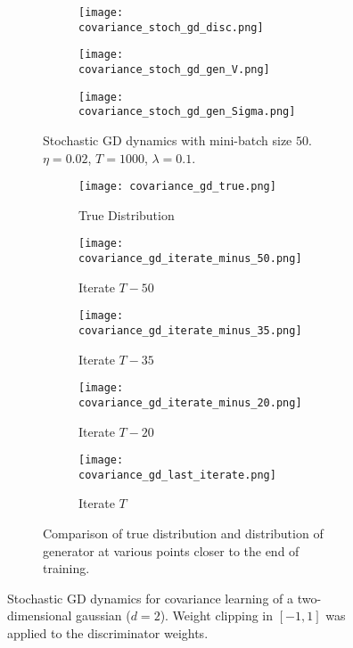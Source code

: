 \begin{figure}[H]
    \begin{subfigure}[b]{1\textwidth}
        \centering
    		\begin{subfigure}[b]{.3\textwidth}
    		\texttt{[image: covariance\_stoch\_gd\_disc.png]}
			\end{subfigure}        
    		\begin{subfigure}[b]{.3\textwidth}
    		\texttt{[image: covariance\_stoch\_gd\_gen\_V.png]}
			\end{subfigure}        
    		\begin{subfigure}[b]{.3\textwidth}
    		\texttt{[image: covariance\_stoch\_gd\_gen\_Sigma.png]}
			\end{subfigure}        
        \caption{Stochastic GD dynamics with mini-batch size $50$. $\eta=0.02$, $T=1000$, $\lambda=0.1$.}
    \end{subfigure}
    \begin{subfigure}[b]{1.01\textwidth}
    		\begin{subfigure}[b]{.19\textwidth}
    		\hspace{-.3in}     	
    		\texttt{[image: covariance\_gd\_true.png]}
    		\caption{True Distribution}
			\end{subfigure}        
    		\begin{subfigure}[b]{.19\textwidth}
    		\hspace{-.3in}     	
    		\texttt{[image: covariance\_gd\_iterate\_minus\_50.png]}
    		\caption{Iterate $T-50$}
			\end{subfigure}   
    		\begin{subfigure}[b]{.19\textwidth}
    		\hspace{-.3in}     	
    		\texttt{[image: covariance\_gd\_iterate\_minus\_35.png]}
    		\caption{Iterate $T-35$}
			\end{subfigure}   
    		\begin{subfigure}[b]{.19\textwidth}
    		\hspace{-.3in}     	
    		\texttt{[image: covariance\_gd\_iterate\_minus\_20.png]}
    		\caption{Iterate $T-20$}
			\end{subfigure}  
    		\begin{subfigure}[b]{.19\textwidth}
    		\hspace{-.3in}     	
    		\texttt{[image: covariance\_gd\_last\_iterate.png]}
    		\caption{Iterate $T$}
			\end{subfigure}  
    	\caption{Comparison of true distribution and distribution of generator at various points closer to the end of training.}
    \end{subfigure}
    \caption{Stochastic GD dynamics for covariance learning of a two-dimensional gaussian ($d=2$). Weight clipping in $[-1,1]$ was applied to the discriminator weights.}\label{fig:stoch_covariance}
\end{figure}

